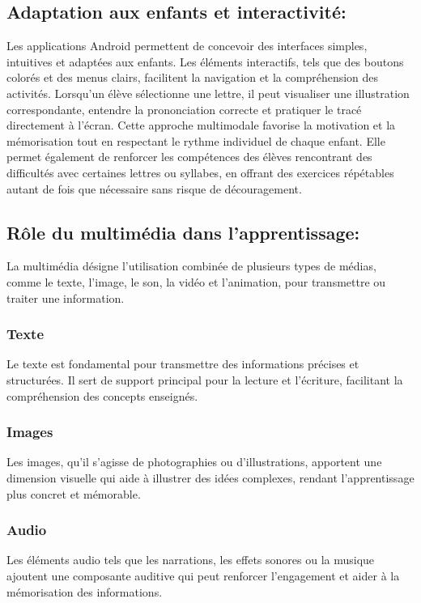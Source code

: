 \documentclass[a4paper,oneside,12pt]{book}
\begin{document}
\subsection{Adaptation aux enfants et interactivité:}
Les applications Android permettent de concevoir des interfaces simples, intuitives et adaptées aux enfants. Les éléments interactifs, tels que des boutons colorés et des menus clairs, facilitent la navigation et la compréhension des activités. Lorsqu'un élève sélectionne une lettre, il peut visualiser une illustration correspondante, entendre la prononciation correcte et pratiquer le tracé directement à l'écran. Cette approche multimodale favorise la motivation et la mémorisation tout en respectant le rythme individuel de chaque enfant. Elle permet également de renforcer les compétences des élèves rencontrant des difficultés avec certaines lettres ou syllabes, en offrant des exercices répétables autant de fois que nécessaire sans risque de découragement.



\subsection{Rôle du multimédia dans l'apprentissage:}
La multimédia désigne l'utilisation combinée de plusieurs types de médias, comme le texte, l'image, le son, la vidéo et l'animation, pour transmettre ou traiter une information.
\subsubsection*{Texte}
Le texte est fondamental pour transmettre des informations précises et structurées. Il sert de support principal pour la lecture et l'écriture, facilitant la compréhension des concepts enseignés.

\subsubsection*{Images}
Les images, qu'il s'agisse de photographies ou d'illustrations, apportent une dimension visuelle qui aide à illustrer des idées complexes, rendant l'apprentissage plus concret et mémorable.

\subsubsection*{Audio}
Les éléments audio tels que les narrations, les effets sonores ou la musique ajoutent une composante auditive qui peut renforcer l'engagement et aider à la mémorisation des informations.
\end{document}
